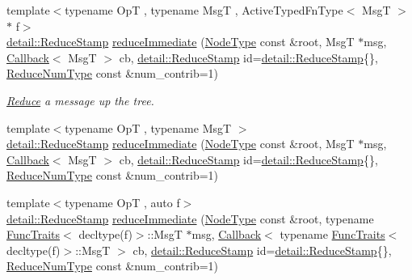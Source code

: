 \begin{DoxyCompactItemize}
{\footnotesize template$<$typename OpT , typename MsgT , Active\+Typed\+Fn\+Type$<$ Msg\+T $>$ $\ast$ f$>$ }\\\hyperlink{namespacevt_1_1collective_1_1reduce_1_1detail_aacc1fcd729d934ba143fee3a943bf9e7}{detail\+::\+Reduce\+Stamp} \hyperlink{structvt_1_1collective_1_1reduce_1_1_reduce_a6c7cea8e7fe0d296db87e74189e93110}{reduce\+Immediate} (\hyperlink{namespacevt_a866da9d0efc19c0a1ce79e9e492f47e2}{Node\+Type} const \&root, MsgT $\ast$msg, \hyperlink{namespacevt_a57b238783d05de96bc2c4027f7073b7f}{Callback}$<$ MsgT $>$ cb, \hyperlink{namespacevt_1_1collective_1_1reduce_1_1detail_aacc1fcd729d934ba143fee3a943bf9e7}{detail\+::\+Reduce\+Stamp} id=\hyperlink{namespacevt_1_1collective_1_1reduce_1_1detail_aacc1fcd729d934ba143fee3a943bf9e7}{detail\+::\+Reduce\+Stamp}\{\}, \hyperlink{structvt_1_1collective_1_1reduce_1_1_reduce_a6c3e63aca10c31d2823b0b18cf9762a4}{Reduce\+Num\+Type} const \&num\+\_\+contrib=1)
\begin{DoxyCompactList}\small\item\em \hyperlink{structvt_1_1collective_1_1reduce_1_1_reduce}{Reduce} a message up the tree. \end{DoxyCompactList}\item 
{\footnotesize template$<$typename OpT , typename MsgT $>$ }\\\hyperlink{namespacevt_1_1collective_1_1reduce_1_1detail_aacc1fcd729d934ba143fee3a943bf9e7}{detail\+::\+Reduce\+Stamp} \hyperlink{structvt_1_1collective_1_1reduce_1_1_reduce_a296aa77831aa884e1feedbebdb9dd5d8}{reduce\+Immediate} (\hyperlink{namespacevt_a866da9d0efc19c0a1ce79e9e492f47e2}{Node\+Type} const \&root, MsgT $\ast$msg, \hyperlink{namespacevt_a57b238783d05de96bc2c4027f7073b7f}{Callback}$<$ MsgT $>$ cb, \hyperlink{namespacevt_1_1collective_1_1reduce_1_1detail_aacc1fcd729d934ba143fee3a943bf9e7}{detail\+::\+Reduce\+Stamp} id=\hyperlink{namespacevt_1_1collective_1_1reduce_1_1detail_aacc1fcd729d934ba143fee3a943bf9e7}{detail\+::\+Reduce\+Stamp}\{\}, \hyperlink{structvt_1_1collective_1_1reduce_1_1_reduce_a6c3e63aca10c31d2823b0b18cf9762a4}{Reduce\+Num\+Type} const \&num\+\_\+contrib=1)
\item 
{\footnotesize template$<$typename OpT , auto f$>$ }\\\hyperlink{namespacevt_1_1collective_1_1reduce_1_1detail_aacc1fcd729d934ba143fee3a943bf9e7}{detail\+::\+Reduce\+Stamp} \hyperlink{structvt_1_1collective_1_1reduce_1_1_reduce_aa67345409ff38a10715ee87821b02e10}{reduce\+Immediate} (\hyperlink{namespacevt_a866da9d0efc19c0a1ce79e9e492f47e2}{Node\+Type} const \&root, typename \hyperlink{structvt_1_1_func_traits}{Func\+Traits}$<$ decltype(f)$>$\+::MsgT $\ast$msg, \hyperlink{namespacevt_a57b238783d05de96bc2c4027f7073b7f}{Callback}$<$ typename \hyperlink{structvt_1_1_func_traits}{Func\+Traits}$<$ decltype(f)$>$\+::MsgT $>$ cb, \hyperlink{namespacevt_1_1collective_1_1reduce_1_1detail_aacc1fcd729d934ba143fee3a943bf9e7}{detail\+::\+Reduce\+Stamp} id=\hyperlink{namespacevt_1_1collective_1_1reduce_1_1detail_aacc1fcd729d934ba143fee3a943bf9e7}{detail\+::\+Reduce\+Stamp}\{\}, \hyperlink{structvt_1_1collective_1_1reduce_1_1_reduce_a6c3e63aca10c31d2823b0b18cf9762a4}{Reduce\+Num\+Type} const \&num\+\_\+contrib=1)

\end{DoxyCompactItemize}
